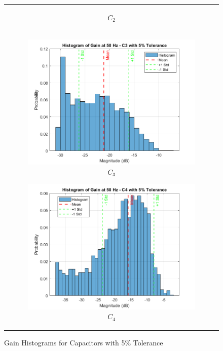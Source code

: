 \documentclass[hidelinks,12pt]{article}
\begin{document}
\begin{figure}[!h]
\begin{tabular}{c}
\begin{subfigure}[t]{0.5\textwidth}
					\caption{$C_2$}
				\end{subfigure} \\
				
				\begin{subfigure}[t]{0.5\textwidth}
					\centering
					\includegraphics[width=\textwidth]{figures/5_percent/c3.png}
					\caption{$C_3$}
				\end{subfigure}
				\hfill
				\begin{subfigure}[t]{0.5\textwidth}
					\centering
					\includegraphics[width=\textwidth]{figures/5_percent/c4.png}
					\caption{$C_4$}
				\end{subfigure}
			\end{tabular}
		\caption{Gain Histograms for Capacitors with 5\% Tolerance}
	\end{figure}
	
\end{document}
